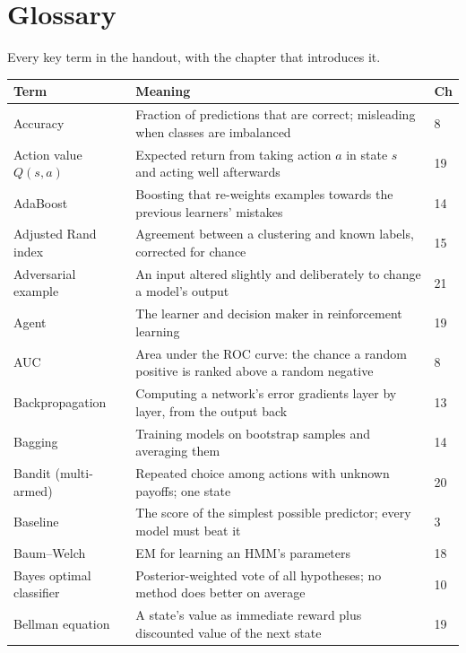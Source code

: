 \chapter{Glossary}\label{app:glossary}
\normalfigures

Every key term in the handout, with the chapter that introduces it.

\begin{longtable}{@{}L{3.9cm}L{9.9cm}L{1.1cm}@{}}
\toprule
{}
\textbf{Term} & \textbf{Meaning} & \textbf{Ch} \\
\midrule
\endhead
Accuracy & Fraction of predictions that are correct; misleading when classes are imbalanced & 8 \\
Action value $Q(s, a)$ & Expected return from taking action $a$ in state $s$ and acting well afterwards & 19 \\
AdaBoost & Boosting that re-weights examples towards the previous learners' mistakes & 14 \\
Adjusted Rand index & Agreement between a clustering and known labels, corrected for chance & 15 \\
Adversarial example & An input altered slightly and deliberately to change a model's output & 21 \\
Agent & The learner and decision maker in reinforcement learning & 19 \\
AUC & Area under the ROC curve: the chance a random positive is ranked above a random negative & 8 \\
Backpropagation & Computing a network's error gradients layer by layer, from the output back & 13 \\
Bagging & Training models on bootstrap samples and averaging them & 14 \\
Bandit (multi-armed) & Repeated choice among actions with unknown payoffs; one state & 20 \\
Baseline & The score of the simplest possible predictor; every model must beat it & 3 \\
Baum--Welch & EM for learning an HMM's parameters & 18 \\
Bayes optimal classifier & Posterior-weighted vote of all hypotheses; no method does better on average & 10 \\
Bellman equation & A state's value as immediate reward plus discounted value of the next state & 19 \\

\end{longtable}
